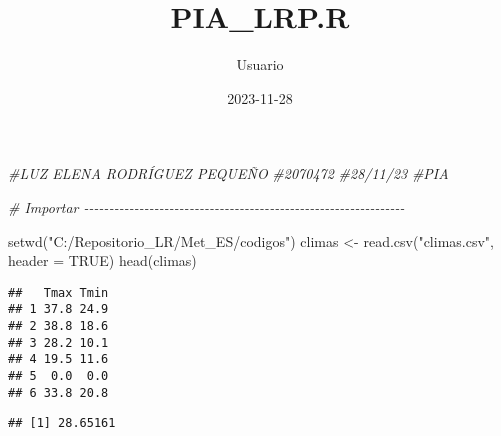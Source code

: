 \documentclass[
]{article}
\title{PIA\_LRP.R}
\author{Usuario}
\date{2023-11-28}
\newenvironment{Shaded}{\begin{snugshade}}{\end{snugshade}}
\newcommand{\AttributeTok}[1]{\textcolor[rgb]{0.77,0.63,0.00}{#1}}
\newcommand{\CommentTok}[1]{\textcolor[rgb]{0.56,0.35,0.01}{\textit{#1}}}
\newcommand{\ConstantTok}[1]{\textcolor[rgb]{0.00,0.00,0.00}{#1}}
\newcommand{\FunctionTok}[1]{\textcolor[rgb]{0.00,0.00,0.00}{#1}}
\newcommand{\NormalTok}[1]{#1}
\newcommand{\OtherTok}[1]{\textcolor[rgb]{0.56,0.35,0.01}{#1}}
\newcommand{\SpecialCharTok}[1]{\textcolor[rgb]{0.00,0.00,0.00}{#1}}
\newcommand{\StringTok}[1]{\textcolor[rgb]{0.31,0.60,0.02}{#1}}
\begin{document}
\maketitle

\begin{Shaded}
\begin{Highlighting}[]
\CommentTok{\#LUZ ELENA RODRÍGUEZ PEQUEÑO}
\CommentTok{\#2070472}
\CommentTok{\#28/11/23}
\CommentTok{\#PIA}


\CommentTok{\# Importar {-}{-}{-}{-}{-}{-}{-}{-}{-}{-}{-}{-}{-}{-}{-}{-}{-}{-}{-}{-}{-}{-}{-}{-}{-}{-}{-}{-}{-}{-}{-}{-}{-}{-}{-}{-}{-}{-}{-}{-}{-}{-}{-}{-}{-}{-}{-}{-}{-}{-}{-}{-}{-}{-}{-}{-}{-}{-}{-}{-}{-}{-}{-}{-}}

\FunctionTok{setwd}\NormalTok{(}\StringTok{"C:/Repositorio\_LR/Met\_ES/codigos"}\NormalTok{)}
\NormalTok{climas }\OtherTok{\textless{}{-}} \FunctionTok{read.csv}\NormalTok{(}\StringTok{"climas.csv"}\NormalTok{, }\AttributeTok{header =} \ConstantTok{TRUE}\NormalTok{) }
\FunctionTok{head}\NormalTok{(climas)}
\end{Highlighting}
\end{Shaded}

\begin{verbatim}
##   Tmax Tmin
## 1 37.8 24.9
## 2 38.8 18.6
## 3 28.2 10.1
## 4 19.5 11.6
## 5  0.0  0.0
## 6 33.8 20.8
\end{verbatim}

\begin{Shaded}
\end{Shaded}

\begin{verbatim}
## [1] 28.65161
\end{verbatim}

\begin{Shaded}
\end{Shaded}
\end{document}
